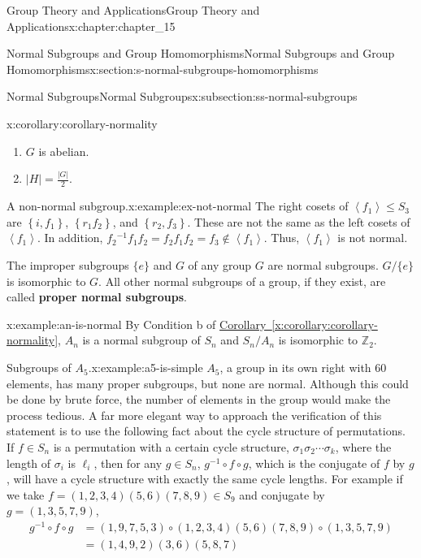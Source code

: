 \documentclass[oneside,10pt,]{book}
\newcommand{\xreffont}{\relax}
\newcommand{\terminology}[1]{\textbf{#1}}
\numberwithin{equation}{section}
\begin{document}
\begin{chapterptx}{Group Theory and Applications}{}{Group Theory and Applications}{}{}{x:chapter:chapter_15}
\begin{sectionptx}{Normal Subgroups and Group Homomorphisms}{}{Normal Subgroups and Group Homomorphisms}{}{}{x:section:s-normal-subgroups-homomorphisms}
\begin{subsectionptx}{Normal Subgroups}{}{Normal Subgroups}{}{}{x:subsection:ss-normal-subgroups}
\begin{corollary}{}{}{x:corollary:corollary-normality}
\begin{enumerate}[label=(\alph*)]
\item{}\(G\) is abelian.%
\item{}\(\left| H\right|  = \frac{\left| G\right| }{2}\).%
\end{enumerate}
%
\end{corollary}
\begin{example}{A non-normal subgroup.}{x:example:ex-not-normal}%
The right cosets of \(\left\langle f_1\right\rangle \leq  S_3\) are \(\left\{i, f_1\right\}\), \(\left\{r_1 f_2 \right\}\), and \(\left\{r_2 ,f_3\right\}\). These are not the same as the left cosets of \(\left\langle f_1\right\rangle\). In addition, \(f_2{}^{-1}f_1f_2=f_2f_1f_2=f_3\notin
\left\langle f_1\right\rangle\). Thus, \(\left\langle f_1\right\rangle\) is not normal.%
\end{example}
The improper subgroups \(\{e\}\) and \(G\) of any group \(G\) are normal subgroups.  \(G/\{e\}\) is isomorphic to \(G\).  All other normal subgroups of a group, if they exist, are called \terminology{proper normal subgroups}.%
\begin{example}{}{x:example:an-is-normal}%
By Condition b of \hyperref[x:corollary:corollary-normality]{Corollary~{\xreffont\ref{x:corollary:corollary-normality}}}, \(A_n\) is a normal subgroup of \(S_n\) and \(S_n/A_n\)  is isomorphic to \(\mathbb{Z}_2\).%
\end{example}
\begin{example}{Subgroups of \(A_5\).}{x:example:a5-is-simple}%
\(A_5\), a group in its own right with 60 elements, has many proper subgroups, but none are normal. Although this could be done by brute force, the number of elements in the group would make the process tedious.  A far more elegant way to approach the verification of this statement is to use the following fact about the cycle structure of permutations.    If \(f\in S_n\) is a permutation with a certain cycle structure,  \(\sigma _1\sigma _2\cdots \sigma _k\), where the length of \(\sigma _i\) is \(\ell_i\), then for any \(g\in S_n\),   \(g^{-1}\circ
f\circ g\), which is the conjugate of \(f\) by \(g\),  will have a cycle structure with exactly the same cycle lengths.   For example if we take \(f=(1,2,3,4)(5,6)(7,8,9)\in S_9\) and conjugate by \(g=(1,3,5,7,9)\),%
\begin{equation*}
\begin{split}
g^{-1}\circ f\circ g & =(1,9,7,5,3)\circ (1,2,3,4)(5,6)(7,8,9)\circ (1,3,5,7,9)\\
& = (1,4,9,2)(3,6)(5,8,7)\\

\end{split}
\end{equation*}
\end{example}
\end{subsectionptx}
\end{sectionptx}
\end{chapterptx}
\end{document}
